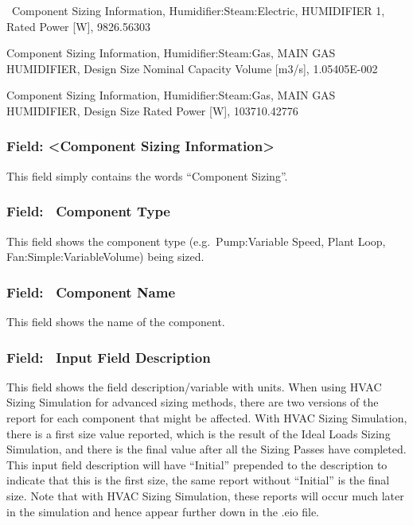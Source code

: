 ~Component Sizing Information, Humidifier:Steam:Electric, HUMIDIFIER 1, Rated Power {[}W{]}, 9826.56303

Component Sizing Information, Humidifier:Steam:Gas, MAIN GAS HUMIDIFIER, Design Size Nominal Capacity Volume {[}m3/s{]}, 1.05405E-002

Component Sizing Information, Humidifier:Steam:Gas, MAIN GAS HUMIDIFIER, Design Size Rated Power {[}W{]}, 103710.42776

\subsubsection{Field: \textless{}Component Sizing Information\textgreater{}}\label{field-component-sizing-information}

This field simply contains the words ``Component Sizing''.

\subsubsection{Field: ~Component Type}\label{field-component-type}

This field shows the component type (e.g.~Pump:Variable Speed, Plant Loop, Fan:Simple:VariableVolume) being sized.

\subsubsection{Field: ~Component Name}\label{field-component-name}

This field shows the name of the component.

\subsubsection{Field: ~Input Field Description}\label{field-input-field-description}

This field shows the field description/variable with units. When using HVAC Sizing Simulation for advanced sizing methods, there are two versions of the report for each component that might be affected. With HVAC Sizing Simulation, there is a first size value reported, which is the result of the Ideal Loads Sizing Simulation, and there is the final value after all the Sizing Passes have completed. This input field description will have ``Initial'' prepended to the description to indicate that this is the first size, the same report without ``Initial'' is the final size. Note that with HVAC Sizing Simulation, these reports will occur much later in the simulation and hence appear further down in the .eio file.

